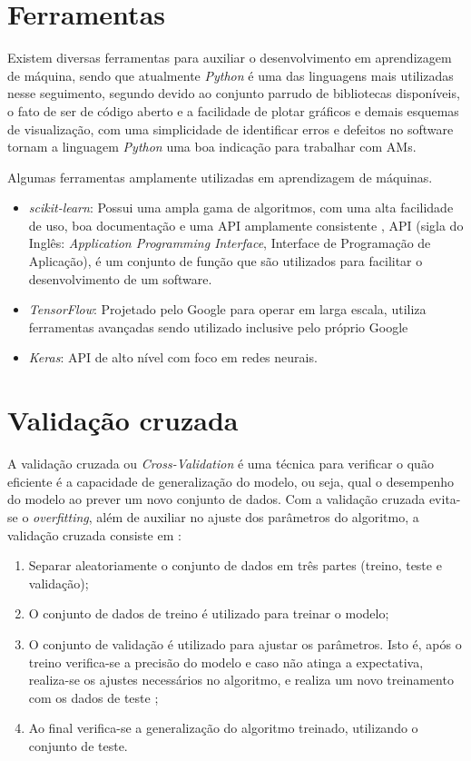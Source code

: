 \section{Ferramentas}
Existem diversas ferramentas para auxiliar o desenvolvimento em aprendizagem de máquina, sendo que atualmente \textit{Python} é uma das linguagens mais utilizadas nesse seguimento, segundo  devido ao conjunto parrudo de bibliotecas disponíveis, o fato de ser de código aberto e a facilidade de plotar gráficos e demais esquemas de visualização, com uma simplicidade de identificar erros e defeitos no software tornam a linguagem \textit{Python} uma boa indicação para trabalhar com AMs.

Algumas ferramentas amplamente utilizadas em aprendizagem de máquinas.
\begin{itemize}
    \item \textit{scikit-learn}: Possui uma ampla gama de algoritmos, com uma alta facilidade de uso, boa documentação e uma API amplamente consistente \cite{scikit-learn}, API (sigla do Inglês: \textit{Application Programming Interface}, Interface de Programação de Aplicação), é um conjunto de função que são utilizados para facilitar o desenvolvimento de um software. 
    \item \textit{TensorFlow}: Projetado pelo Google para operar em larga escala, utiliza ferramentas avançadas sendo utilizado inclusive pelo próprio Google\cite{abadi2016tensorflow}
    \item \textit{Keras}: API de alto nível com foco em redes neurais.
\end{itemize}

\section{Validação cruzada}
A validação cruzada ou \textit{Cross-Validation} é uma técnica para verificar o quão eficiente é a capacidade de generalização do modelo, ou seja, qual o desempenho do modelo ao prever um novo conjunto de dados. Com a validação cruzada evita-se o \textit{overfitting}, além de auxiliar no ajuste dos parâmetros do algoritmo, a validação cruzada consiste em \cite{james2013introduction}:

\begin{enumerate}
    \item Separar aleatoriamente o conjunto de dados em três partes (treino, teste e validação);
    \item O conjunto de dados de treino é utilizado para treinar o modelo;
    \item O conjunto de validação é utilizado para ajustar os parâmetros. Isto é, após o treino verifica-se a precisão do modelo e caso não atinga a expectativa, realiza-se os ajustes necessários no algoritmo, e realiza um novo treinamento com os dados de teste \cite{raschka2015python};
    \item Ao final verifica-se a generalização do algoritmo treinado, utilizando o conjunto de teste.
\end{enumerate}

